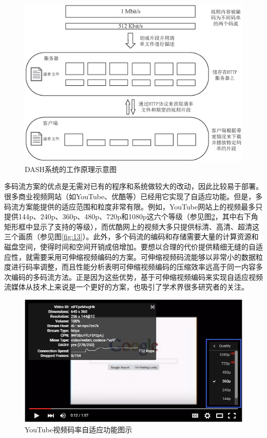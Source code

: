 \begin{figure}[t]
	\centering
	\vspace{10pt}
	\includegraphics[width = 1.0\linewidth]{eps/DASH}
	\caption{DASH系统的工作原理示意图\label{fig:DASH}}
\end{figure}

多码流方案的优点是无需对已有的程序和系统做较大的改动，因此比较易于部署\supercite{Bouten2014}。很多商业视频网站（如YouTube、优酷等）已经用它实现了自适应功能。但是，多码流方案能提供的适应范围和粒度非常有限。例如，YouTube网站上的视频最多只提供144p、240p、360p、480p、720p和1080p这六个等级（参见图\ref{fig:13-1}，其中右下角矩形框中显示了支持的等级），而优酷网上的视频大多只提供标清、高清、超清这三个画质（参见图\ref{fig:13}）。此外，多个码流的编码和存储需要大量的计算资源和磁盘空间，使得时间和空间开销成倍增加。要想以合理的代价提供精细无缝的自适应性，就需要采用可伸缩视频编码的方案。可伸缩视频码流能够以非常小的数据粒度进行码率调整，而且性能分析表明可伸缩视频编码的压缩效率远高于同一内容多次编码的多码流方法\supercite{SVC-Performance}。正是因为这些优势，基于可伸缩视频编码来实现自适应视频流媒体从技术上来说是一个更好的方案，也吸引了学术界很多研究者的关注\supercite{Chuah2012, Zhu2013, Dan2013, Yang2014, Cicalo2014}。

\begin{figure}[t]
	\centering
	\vspace{20pt}
	\includegraphics[width = 1.0\linewidth]{clip/13-1.png}
	\vspace{10pt}
	\caption{YouTube视频码率自适应功能图示\label{fig:13-1}}
	\vspace{10pt}
\end{figure}


